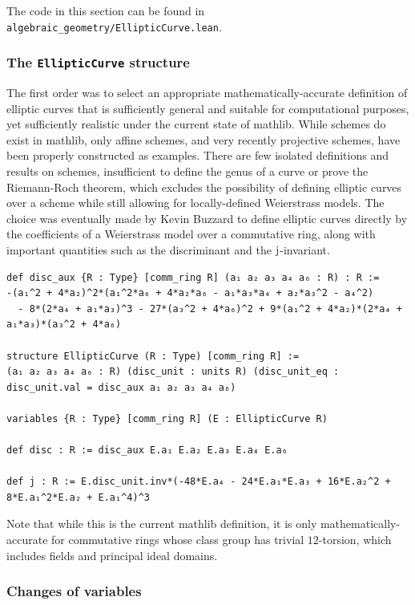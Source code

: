 The code in this section can be found in \texttt{algebraic\_geometry/EllipticCurve.lean}.

\subsubsection{The \texttt{EllipticCurve} structure}

The first order was to select an appropriate mathematically-accurate definition of elliptic curves that is sufficiently general and suitable for computational purposes, yet sufficiently realistic under the current state of mathlib. While schemes do exist in mathlib, only affine schemes, and very recently projective schemes, have been properly constructed as examples. There are few isolated definitions and results on schemes, insufficient to define the genus of a curve or prove the Riemann-Roch theorem, which excludes the possibility of defining elliptic curves over a scheme while still allowing for locally-defined Weierstrass models. The choice was eventually made by Kevin Buzzard to define elliptic curves directly by the coefficients of a Weierstrass model over a commutative ring, along with important quantities such as the discriminant and the $ \mathrm{j} $-invariant.

\begin{lstlisting}[frame=single]
def disc_aux {R : Type} [comm_ring R] (a₁ a₂ a₃ a₄ a₆ : R) : R :=
-(a₁^2 + 4*a₂)^2*(a₁^2*a₆ + 4*a₂*a₆ - a₁*a₃*a₄ + a₂*a₃^2 - a₄^2)
  - 8*(2*a₄ + a₁*a₃)^3 - 27*(a₃^2 + 4*a₆)^2 + 9*(a₁^2 + 4*a₂)*(2*a₄ + a₁*a₃)*(a₃^2 + 4*a₆)

structure EllipticCurve (R : Type) [comm_ring R] :=
(a₁ a₂ a₃ a₄ a₆ : R) (disc_unit : units R) (disc_unit_eq : disc_unit.val = disc_aux a₁ a₂ a₃ a₄ a₆)

variables {R : Type} [comm_ring R] (E : EllipticCurve R)

def disc : R := disc_aux E.a₁ E.a₂ E.a₃ E.a₄ E.a₆

def j : R := E.disc_unit.inv*(-48*E.a₄ - 24*E.a₁*E.a₃ + 16*E.a₂^2 + 8*E.a₁^2*E.a₂ + E.a₁^4)^3
\end{lstlisting}

Note that while this is the current mathlib definition, it is only mathematically-accurate for commutative rings whose class group has trivial $ 12 $-torsion, which includes fields and principal ideal domains.

\subsubsection{Changes of variables}

